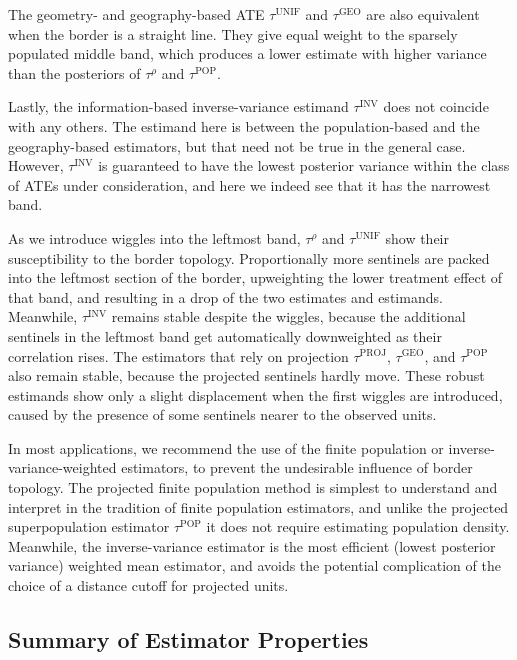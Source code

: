 \documentclass[letter]{article}
\newcommand{\unifavg}{\tau^{\mathrm{UNIF}}}
\newcommand{\invvar}{\tau^{\mathrm{INV}}}
\newcommand{\taurho}{\tau^{\rho}}
\newcommand{\tauproj}{\tau^{\mathrm{PROJ}}}
\newcommand{\taugeo}{\tau^{\mathrm{GEO}}}
\newcommand{\taupop}{\tau^{\mathrm{POP}}}
\begin{document}
The geometry- and geography-based ATE \(\unifavg\) and \(\taugeo\) are also equivalent when the border is a straight line.
They give equal weight to the sparsely populated middle band, which produces a lower estimate with higher variance than the posteriors of \(\taurho\) and \(\taupop\).

Lastly, the information-based inverse-variance estimand \(\invvar\) does not coincide with any others.
The estimand here is between the population-based and the geography-based estimators, but that need not be true in the general case.
However, \(\invvar\) is guaranteed to have the lowest posterior variance within the class of ATEs under consideration, and here we indeed see that it has the narrowest band.

As we introduce wiggles into the leftmost band,
\(\taurho\) and \(\unifavg\) show their susceptibility to the border topology.
Proportionally more sentinels are packed into the leftmost section of the border,
upweighting the lower treatment effect of that band,
and resulting in a drop of the two estimates and estimands.
Meanwhile, \(\invvar\) remains stable despite the wiggles,
because the additional sentinels in the leftmost
band get automatically downweighted as their correlation rises.
The estimators that rely on projection
\(\tauproj\), \(\taugeo\), and \(\taupop\) also remain stable,
because the projected sentinels hardly move.
These robust estimands show only a slight displacement when the first wiggles are introduced,
caused by the presence of some sentinels nearer to the observed units.

In most applications, we recommend the use of the finite population or inverse-variance-weighted estimators, to prevent the undesirable influence of border topology.
The projected finite population method is simplest to understand and interpret in the tradition of finite population estimators, and unlike the projected superpopulation estimator \(\taupop\) it does not require estimating population density.
Meanwhile, the inverse-variance estimator is the most efficient (lowest posterior variance) weighted mean estimator,
and avoids the potential complication of the choice of a distance cutoff for projected units.
    


    	\subsection{Summary of Estimator Properties}\label{summary-of-estimator-properties}
\end{document}

